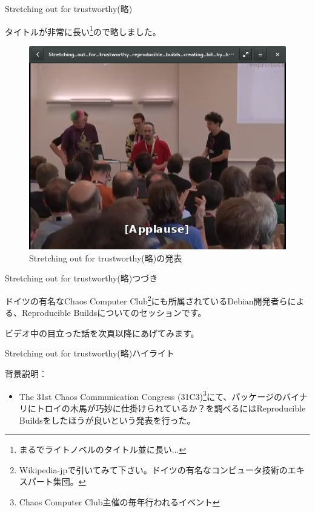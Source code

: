 \begin{frame}{Stretching out for trustworthy(略)}

  タイトルが非常に長い\footnote{まるでライトノベルのタイトル並に長い...}ので略しました。

\begin{figure}[H]
\begin{center}
\includegraphics[width=0.8\hsize]{image201510/reproduct.png}
\end{center}
\caption{Stretching out for trustworthy(略)の発表}
\end{figure}
\end{frame}

\begin{frame}{Stretching out for trustworthy(略)つづき}

  ドイツの有名なChaos Computer Club\footnote{Wikipedia-jpで引いてみて下さい。ドイツの有名なコンピュータ技術のエキスパート集団。}にも所属されているDebian開発者らによる、Reproducible Buildsについてのセッションです。

  ビデオ中の目立った話を次頁以降にあげてみます。
\end{frame}

\begin{frame}{Stretching out for trustworthy(略)ハイライト}

  背景説明：
 \begin{itemize}
 \item The 31st Chaos Communication Congress (31C3)\footnote{Chaos Computer Club主催の毎年行われるイベント}にて、パッケージのバイナリにトロイの木馬が巧妙に仕掛けられているか？を調べるにはReproducible Buildsをしたほうが良いという発表を行った。
 \end{itemize}
\end{frame}

